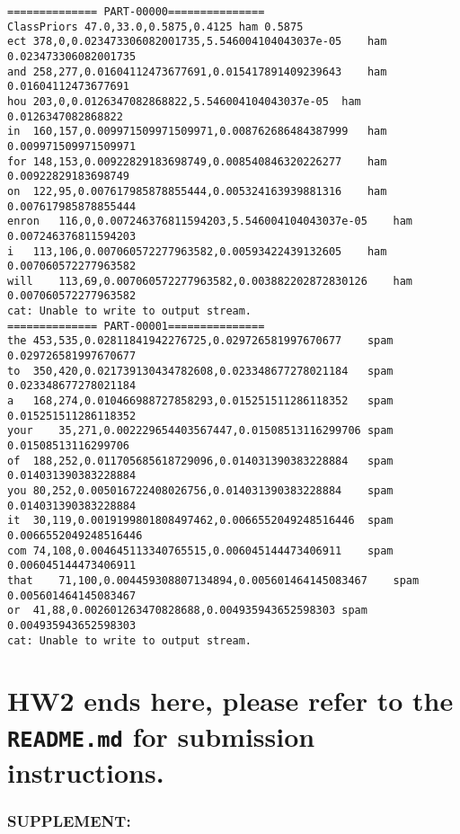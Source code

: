 \documentclass[11pt]{article}
\begin{document}
    \begin{Verbatim}[commandchars=\\\{\}]
============== PART-00000===============
ClassPriors	47.0,33.0,0.5875,0.4125	ham	0.5875	
ect	378,0,0.023473306082001735,5.546004104043037e-05	ham	0.023473306082001735	
and	258,277,0.01604112473677691,0.015417891409239643	ham	0.01604112473677691	
hou	203,0,0.0126347082868822,5.546004104043037e-05	ham	0.0126347082868822	
in	160,157,0.009971509971509971,0.008762686484387999	ham	0.009971509971509971	
for	148,153,0.00922829183698749,0.008540846320226277	ham	0.00922829183698749	
on	122,95,0.007617985878855444,0.005324163939881316	ham	0.007617985878855444	
enron	116,0,0.007246376811594203,5.546004104043037e-05	ham	0.007246376811594203	
i	113,106,0.007060572277963582,0.00593422439132605	ham	0.007060572277963582	
will	113,69,0.007060572277963582,0.003882202872830126	ham	0.007060572277963582	
cat: Unable to write to output stream.
============== PART-00001===============
the	453,535,0.02811841942276725,0.029726581997670677	spam	0.029726581997670677	
to	350,420,0.021739130434782608,0.023348677278021184	spam	0.023348677278021184	
a	168,274,0.010466988727858293,0.015251511286118352	spam	0.015251511286118352	
your	35,271,0.002229654403567447,0.01508513116299706	spam	0.01508513116299706	
of	188,252,0.011705685618729096,0.014031390383228884	spam	0.014031390383228884	
you	80,252,0.005016722408026756,0.014031390383228884	spam	0.014031390383228884	
it	30,119,0.0019199801808497462,0.0066552049248516446	spam	0.0066552049248516446	
com	74,108,0.004645113340765515,0.006045144473406911	spam	0.006045144473406911	
that	71,100,0.004459308807134894,0.005601464145083467	spam	0.005601464145083467	
or	41,88,0.002601263470828688,0.004935943652598303	spam	0.004935943652598303	
cat: Unable to write to output stream.

    \end{Verbatim}

    \section{\texorpdfstring{HW2 ends here, please refer to the
\texttt{README.md} for submission
instructions.}{HW2 ends here, please refer to the README.md for submission instructions.}}\label{hw2-ends-here-please-refer-to-the-readme.md-for-submission-instructions.}

    \subsubsection{SUPPLEMENT:}\label{supplement}
\end{document}
